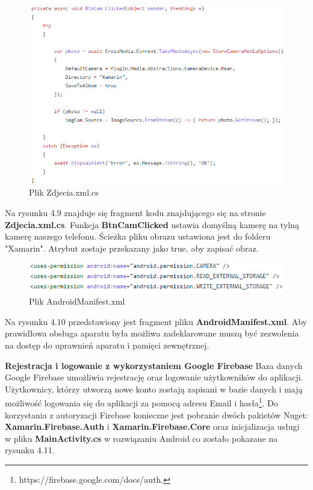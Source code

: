 \begin{figure}[!htb]
	\begin{center}
		\includegraphics[width=12cm]{rys/Zdjecia_xaml_cs.png}
		\caption{Plik Zdjecia.xml.cs}
		\label{rys:rysunek020}
	\end{center}
\end{figure}

Na rysunku 4.9 znajduje się fragment kodu znajdującego się na stronie \textbf{Zdjecia.xml.cs}. Funkcja \textbf{BtnCamClicked} ustawia domyślną kamerę na tylną kamerę naszego telefonu. Ścieżka pliku obrazu ustawiona jest do folderu "Xamarin". Atrybut zostaje przekazany jako true, aby zapisać obraz.
  
\begin{figure}[!htb]
	\begin{center}
		\includegraphics[width=12cm]{rys/Zdjecia_manifest.png}
		\caption{Plik AndroidManifest.xml}
		\label{rys:rysunek021}
	\end{center}
\end{figure}  

Na rysunku 4.10 przedstawiony jest fragment pliku \textbf{AndroidManifest.xml}. Aby prawidłowa obsługa aparatu była możliwa zadeklarowane muszą być zezwolenia na dostęp do uprawnień aparatu i pamięci zewnętrznej. \newline \newline

\textbf{Rejestracja i logowanie z wykorzystaniem Google Firebase} \newline
Baza danych Google Firebase umożliwia rejestrację oraz logowanie użytkowników do aplikacji. Użytkownicy, którzy utworzą nowe konto zostają zapisani w bazie danych i mają możliwość logowania się do aplikacji za pomocą adresu Email i hasła\footnote{https://firebase.google.com/docs/auth\cite{www3}.}. \newline
Do korzystania z autoryzacji Firebase konieczne jest pobranie dwóch pakietów Nuget: \textbf{Xamarin.Firebase.Auth} i \textbf{Xamarin.Firebase.Core} oraz inicjalizacja usługi w pliku \textbf{MainActivity.cs} w rozwiązaniu Android co zostało pokazane na rysunku 4.11.

